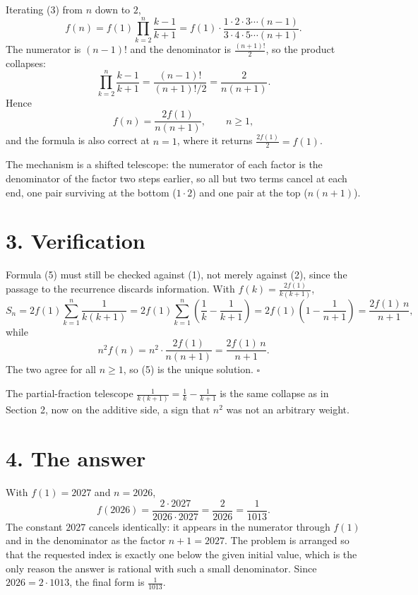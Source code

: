 \documentclass[12pt]{article}
\begin{document}
Iterating (3) from \(n\) down to \(2\),
\[
f(n)=f(1)\prod_{k=2}^{n}\frac{k-1}{k+1}
=f(1)\cdot\frac{1\cdot2\cdot3\cdots(n-1)}{3\cdot4\cdot5\cdots(n+1)} .
\tag{4}
\]
The numerator is \((n-1)!\) and the denominator is
\(\frac{(n+1)!}{2}\), so the product collapses:
\[
\prod_{k=2}^{n}\frac{k-1}{k+1}
=\frac{(n-1)!}{(n+1)!/2}
=\frac{2}{n(n+1)} .
\]
Hence
\[
\boxed{\displaystyle f(n)=\frac{2f(1)}{n(n+1)},\qquad n\ge1,}
\tag{5}
\]
and the formula is also correct at \(n=1\), where it returns
\(\frac{2f(1)}{2}=f(1)\).

The mechanism is a shifted telescope: the numerator of each factor is the
denominator of the factor two steps earlier, so all but two terms cancel
at each end, one pair surviving at the bottom (\(1\cdot2\)) and one
pair at the top (\(n(n+1)\)).

\section*{3. Verification}

Formula (5) must still be checked against (1), not merely against (2),
since the passage to the recurrence discards information. With
\(f(k)=\frac{2f(1)}{k(k+1)}\),
\[
S_n=2f(1)\sum_{k=1}^{n}\frac1{k(k+1)}
=2f(1)\sum_{k=1}^{n}\left(\frac1k-\frac1{k+1}\right)
=2f(1)\left(1-\frac1{n+1}\right)
=\frac{2f(1)\,n}{n+1},
\]
while
\[
n^2f(n)=n^2\cdot\frac{2f(1)}{n(n+1)}=\frac{2f(1)\,n}{n+1}.
\]
The two agree for all \(n\ge1\), so (5) is the unique solution. \(\square\)

The partial-fraction telescope \(\frac1{k(k+1)}=\frac1k-\frac1{k+1}\) is
the same collapse as in Section 2, now on the additive side, a sign
that \(n^2\) was not an arbitrary weight.

\section*{4. The answer}

With \(f(1)=2027\) and \(n=2026\),
\[
f(2026)=\frac{2\cdot2027}{2026\cdot2027}
=\frac{2}{2026}
=\frac1{1013}.
\]
The constant \(2027\) cancels identically: it appears in the numerator
through \(f(1)\) and in the denominator as the factor \(n+1=2027\). The
problem is arranged so that the requested index is exactly one below the
given initial value, which is the only reason the answer is rational with
such a small denominator. Since \(2026=2\cdot1013\), the final form is
\(\frac1{1013}\).
\end{document}
